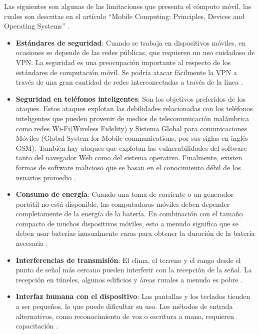 
Las siguientes son algunas de las limitaciones que presenta el cómputo móvil, las cuales son descritas en el artículo “Mobile Computing: Principles, Devices and Operating Systems” \cite{MBPDO}. \\

\begin{itemize}
\item \textbf{Estándares de seguridad}: Cuando se trabaja en dispositivos móviles, en ocasiones se depende de las redes públicas, que requieren un uso cuidadoso de VPN. La seguridad es una preocupación importante al respecto de los estándares de computación móvil. Se podría atacar fácilmente la VPN a través de una gran cantidad de redes interconectadas a través de la línea \cite{MBPDO}.

\item \textbf{Seguridad en teléfonos inteligentes}: Son los objetivos preferidos de los ataques. Estos ataques explotan las debilidades relacionadas con los teléfonos inteligentes que pueden provenir de medios de telecomunicación inalámbrica como redes Wi-Fi(Wireless Fidelity) y Sistema Global para comunicaciones Móviles (Global System for Mobile communications, por sus siglas en inglés GSM). También hay ataques que explotan las vulnerabilidades del software tanto del navegador Web como del sistema operativo. Finalmente, existen formas de software malicioso que se basan en el conocimiento débil de los usuarios promedio \cite{MBPDO}.

\item \textbf{Consumo de energía}: Cuando una toma de corriente o un generador portátil no está disponible, las computadoras móviles deben depender completamente de la energía de la batería. En combinación con el tamaño compacto de muchos dispositivos móviles, esto a menudo significa que se deben usar baterías inusualmente caras para obtener la duración de la batería necesaria \cite{MBPDO}.

\item \textbf{Interferencias de transmisión}: El clima, el terreno y el rango desde el punto de señal más cercano pueden interferir con la recepción de la señal. La recepción en túneles, algunos edificios y áreas rurales a menudo es pobre \cite{MBPDO}.

\item \textbf{Interfaz humana con el dispositivo}: Las pantallas y los teclados tienden a ser pequeños, lo que puede dificultar su uso. Los métodos de entrada alternativos, como reconocimiento de voz o escritura a mano, requieren capacitación \cite{MBPDO}.

\end{itemize}